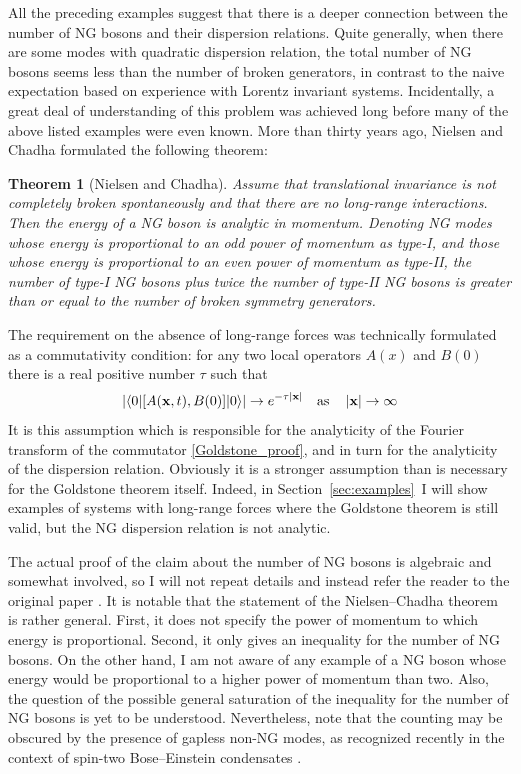 \documentclass[final,2p,times,12pt,sort&compress]{elsarticle}
\newcommand\vek[1]{{\boldsymbol{\bf #1}}}   %
\newcommand\bra[1]{\langle#1\vert}          %
\newcommand\ket[1]{\vert#1\rangle}          %
\newcommand\thname{Theorem}
\newtheorem{theorem}{\thname}
\newcommand\abs[1]{\left|#1\right|}         %
\begin{document}
All the preceding examples suggest that there is a deeper connection between
the number of NG bosons and their dispersion relations. Quite generally, when
there are some modes with quadratic dispersion relation, the total number of NG
bosons seems less than the number of broken generators, in contrast to the
naive expectation based on experience with Lorentz invariant systems.
Incidentally, a great deal of understanding of this problem was achieved long
before many of the above listed examples were even known. More than thirty
years ago, Nielsen and Chadha \cite{Nielsen:1975hm} formulated the following
theorem:
\begin{theorem}[Nielsen and Chadha]
\label{thm:NC}
Assume that translational invariance is not completely broken spontaneously and
that there are no long-range interactions. Then the energy of a NG boson is
analytic in momentum. Denoting NG modes whose energy is proportional to an odd
power of momentum as type-I, and those whose energy is proportional to an even
power of momentum as type-II, \emph{the number of type-I NG bosons plus twice
the number of type-II NG bosons is greater than or equal to the number of broken
symmetry generators.}
\end{theorem}
The requirement on the absence of long-range forces was technically formulated
as a commutativity condition: for any two local operators $A(x)$ and $B(0)$
there is a real positive number $\tau$ such that
\begin{equation}
\abs{\bra0[A(\vek x,t),B(0)]\ket0}\to e^{-\tau\abs{\vek x}}\quad
\text{as}\quad\abs{\vek x}\to\infty
\end{equation}
It is this assumption which is responsible for the analyticity of the Fourier
transform of the commutator \eqref{Goldstone_proof}, and in turn for the
analyticity of the dispersion relation. Obviously it is a stronger assumption
than is necessary for the Goldstone theorem itself. Indeed, in
Section~\ref{sec:examples}\ I will show examples of systems with long-range
forces where the Goldstone theorem is still valid, but the NG dispersion
relation is not analytic.

The actual proof of the claim about the number of NG bosons is algebraic and
somewhat involved, so I will not repeat details and instead refer the reader to
the original paper \cite{Nielsen:1975hm}. It is notable that the statement
of the Nielsen--Chadha theorem is rather general. First, it does not specify the
power of momentum to which energy is proportional. Second, it only gives an
inequality for the number of NG bosons. On the other hand, I am not aware of
any example of a NG boson whose energy would be proportional to a higher power
of momentum than two. Also, the question of the possible general saturation of
the inequality for the number of NG bosons is yet to be understood.
Nevertheless, note that the counting may be obscured by the presence of gapless
non-NG modes, as recognized recently in the context of spin-two Bose--Einstein
condensates \cite{Uchino:2009ya}.
\end{document}
